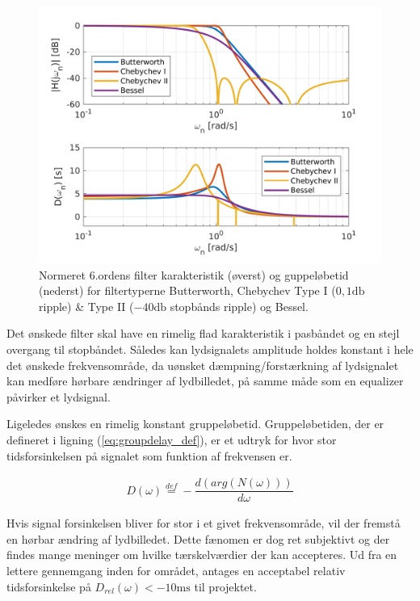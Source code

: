 \begin{figure}[h!]
	\centering
	\includegraphics[width=1\textwidth]{matlab/filter_compare.png}
	\caption{Normeret 6.ordens filter karakteristik (øverst) og guppeløbetid (nederst) for filtertyperne Butterworth, Chebychev Type I ($0,1 \si{\decibel}$ ripple) \& Type II ($-40 \si{\decibel}$ stopbånds ripple) og Bessel.}
	\label{fig:filter_typer}
\end{figure}

Det ønskede filter skal have en rimelig flad karakteristik i pasbåndet og en stejl overgang til stopbåndet.
Således kan lydsignalets amplitude holdes konstant i hele det ønskede frekvensområde, da uønsket dæmpning/forstærkning af lydsignalet kan medføre hørbare ændringer af lydbilledet, på samme måde som en equalizer påvirker et lydsignal. 

Ligeledes ønskes en rimelig konstant gruppeløbetid. 
Gruppeløbetiden, der er defineret i ligning (\ref{eq:groupdelay_def})\cite{anfilter}, er et udtryk for hvor stor tidsforsinkelsen på signalet som funktion af frekvensen er.

\begin{align}
	D(\omega) \stackrel{def}{=} - \dfrac{d(arg(N(\omega)))}{d\omega}\label{eq:groupdelay_def}
\end{align}

Hvis signal forsinkelsen bliver for stor i et givet frekvensområde, vil der fremstå en hørbar ændring af lydbilledet.
Dette fænomen er dog ret subjektivt og der findes mange meninger om hvilke tærskelværdier der kan accepteres.
Ud fra en lettere gennemgang inden for området, antages en acceptabel relativ tidsforsinkelse på $D_{rel}(\omega) < -10 \si{\milli\second}$ til projektet.   


